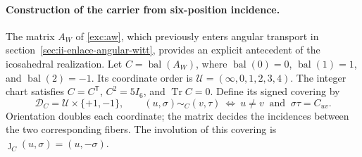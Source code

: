 \paragraph{Construction of the carrier from six-position incidence.}
\label{ii:ico:construccion-firmada}
The matrix \(A_W\) of \eqref{exc:aw}, which previously enters
angular transport in section~\ref{sec:ii-enlace-angular-witt}, provides
an explicit antecedent of the icosahedral realization. Let
\(C=\operatorname{bal}(A_W)\), where
\(\operatorname{bal}(0)=0\), \(\operatorname{bal}(1)=1\), and
\(\operatorname{bal}(2)=-1\). Its coordinate order is
\(\mathcal U=(\infty,0,1,2,3,4)\). The integer chart satisfies
\(C=C^{\mathsf T}\), \(C^2=5I_6\), and \(\operatorname{Tr}C=0\).
Define its signed covering by
\begin{equation}
 \mathcal D_C=\mathcal U\times\{+1,-1\},\qquad
 (u,\sigma)\sim_C(v,\tau)
 \ \Longleftrightarrow\ u\ne v\ \text{ and }\ \sigma\tau=C_{uv}.
 \label{ii:ico:incidencia-firmada}
\end{equation}
Orientation doubles each coordinate; the matrix decides the incidences
between the two corresponding fibers. The involution of this covering
is \(\jmath_C(u,\sigma)=(u,-\sigma)\).

